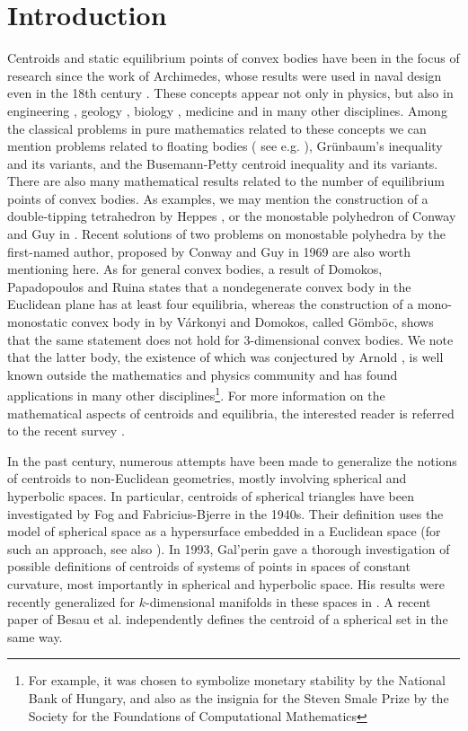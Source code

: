 \documentclass[twoside]{amsart}
\theoremstyle{plain}
\theoremstyle{definition}
\numberwithin{equation}{section}
\begin{document}
\section{Introduction}\label{sec:intro}

Centroids and static equilibrium points of convex bodies have been in the focus of research since the work of Archimedes, whose results were used in naval design even in the 18th century \cite{Archimedes1}. These concepts appear not only in physics, but also in engineering \cite{robotics, varkonyirobotics}, geology \cite{pebbles, korvin}, biology \cite{turtles, turtles2}, medicine \cite{pill} and in many other disciplines. Among the classical problems in pure mathematics related to these concepts we can mention problems related to floating bodies ( see e.g. \cite{scottish, ryabogin, huang}), Gr\"unbaum's inequality \cite{grunbaum} and its variants, and the Busemann-Petty centroid inequality \cite{petty} and its variants. There are also many mathematical results related to the number of equilibrium points of convex bodies. As examples, we may mention the construction of a double-tipping tetrahedron by Heppes \cite{Heppes}, or the monostable polyhedron of Conway and Guy in \cite{GG}. Recent solutions of two problems on monostable polyhedra \cite{Langi22} by the first-named author, proposed by Conway and Guy \cite{GG} in 1969  are also worth mentioning here. As for general convex bodies, a result of Domokos, Papadopoulos and Ruina \cite{DPR} states that a nondegenerate convex body in the Euclidean plane has at least four equilibria, whereas the construction of a mono-monostatic convex body in \cite{VD} by V\'arkonyi and Domokos, called G\"omb\"oc, shows that the same statement does not hold for $3$-dimensional convex bodies. We note that the latter body, the existence of which was conjectured by Arnold \cite{VD2}, is well known outside the mathematics and physics community and has found applications in many other disciplines\footnote{For example, it was chosen to symbolize monetary stability by the National Bank of Hungary, and also as the insignia for the Steven Smale Prize by the Society for the Foundations of Computational Mathematics}. For more information on the mathematical aspects of centroids and equilibria, the interested reader is referred to the recent survey \cite{langivarkonyi}.

In the past century, numerous attempts have been made to generalize the notions of centroids to non-Euclidean geometries, mostly involving spherical and hyperbolic spaces. In particular, centroids of spherical triangles have been investigated by Fog \cite{Fog} and Fabricius-Bjerre \cite{Bjerre} in the 1940s. Their definition uses the model of spherical space as a hypersurface embedded in a Euclidean space (for such an approach, see also \cite{Brock}). In 1993, Gal'perin \cite{Galperin} gave a thorough investigation of possible definitions of centroids of systems of points in spaces of constant curvature, most importantly in spherical and hyperbolic space.  His results were recently generalized for $k$-dimensional manifolds in these spaces in \cite{CC}. A recent paper of Besau et al. \cite{BHPS} independently defines the centroid of a spherical set in the same way.
\end{document}
